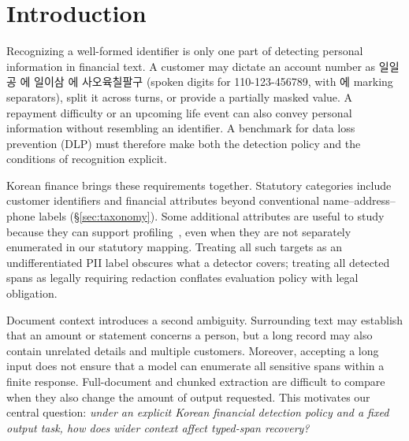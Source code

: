 \section{Introduction}
\label{sec:intro}



Recognizing a well-formed identifier is only one part of detecting personal information in financial text. A customer may dictate an account number as \textup{일일공 에 일이삼 에 사오육칠팔구} (spoken digits for 110-123-456789, with \textup{에} marking separators), split it across turns, or provide a partially masked value. A repayment difficulty or an upcoming life event can also convey personal information without resembling an identifier. A benchmark for data loss prevention (DLP) must therefore make both the detection policy and the conditions of recognition explicit.

Korean finance brings these requirements together. Statutory categories include customer identifiers and financial attributes beyond conventional name--address--phone labels (\S\ref{sec:taxonomy}). Some additional attributes are useful to study because they can support profiling~\cite{staab2024beyond}, even when they are not separately enumerated in our statutory mapping. Treating all such targets as an undifferentiated PII label obscures what a detector covers; treating all detected spans as legally requiring redaction conflates evaluation policy with legal obligation.

Document context introduces a second ambiguity. Surrounding text may establish that an amount or statement concerns a person, but a long record may also contain unrelated details and multiple customers. Moreover, accepting a long input does not ensure that a model can enumerate all sensitive spans within a finite response. Full-document and chunked extraction are difficult to compare when they also change the amount of output requested. This motivates our central question: \emph{under an explicit Korean financial detection policy and a fixed output task, how does wider context affect typed-span recovery?}

